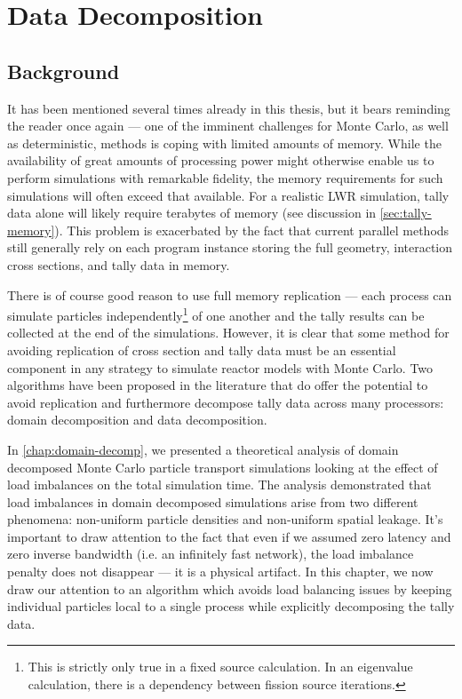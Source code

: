 \chapter{Data Decomposition}
\label{chap:data-decomp}

\section{Background}

It has been mentioned several times already in this thesis, but it bears
reminding the reader once again --- one of the imminent challenges for Monte
Carlo, as well as deterministic, methods is coping with limited amounts of
memory. While the availability of great amounts of processing power might
otherwise enable us to perform simulations with remarkable fidelity, the memory
requirements for such simulations will often exceed that available. For a
realistic LWR simulation, tally data alone will likely require terabytes of
memory (see discussion in \autoref{sec:tally-memory}). This problem is
exacerbated by the fact that current parallel methods still generally rely on
each program instance storing the full geometry, interaction cross sections, and
tally data in memory.

There is of course good reason to use full memory replication --- each process
can simulate particles independently\footnote{This is strictly only true in a
  fixed source calculation. In an eigenvalue calculation, there is a dependency
  between fission source iterations.} of one another and the tally results can
be collected at the end of the simulations. However, it is clear that some
method for avoiding replication of cross section and tally data must be an
essential component in any strategy to simulate reactor models with Monte
Carlo. Two algorithms have been proposed in the literature that do offer the
potential to avoid replication and furthermore decompose tally data across many
processors: domain decomposition and data decomposition.

In \autoref{chap:domain-decomp}, we presented a theoretical analysis of domain
decomposed Monte Carlo particle transport simulations looking at the effect of
load imbalances on the total simulation time. The analysis demonstrated that
load imbalances in domain decomposed simulations arise from two different
phenomena: non-uniform particle densities and non-uniform spatial leakage. It's
important to draw attention to the fact that even if we assumed zero latency and
zero inverse bandwidth (i.e. an infinitely fast network), the load imbalance
penalty does not disappear --- it is a physical artifact. In this chapter, we
now draw our attention to an algorithm which avoids load balancing issues by
keeping individual particles local to a single process while explicitly
decomposing the tally data.


